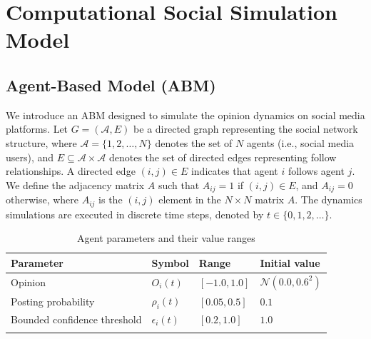 \documentclass[pdflatex,sn-mathphys-num]{sn-jnl}%
\theoremstyle{thmstyleone}%
\theoremstyle{thmstyletwo}%
\theoremstyle{thmstylethree}%
\def\AgentSet{\mathcal{A}}
\def\post{\rho} %
\def\BoundedConfidence{\epsilon}
\begin{document}
\section{Computational Social Simulation Model}\label{model}
\subsection{Agent-Based Model (ABM)}
We introduce an ABM designed to simulate the opinion
dynamics on social media platforms. Let $G = (\AgentSet, E)$ be a
directed graph representing the social network structure, where
$\AgentSet = \{1, 2, \dots, N\}$ denotes the set of $N$ agents (i.e.,
social media users), and $E \subseteq \AgentSet \times \AgentSet$ denotes the
set of directed edges representing follow relationships. A directed
edge $(i, j) \in E$ indicates that agent $i$ follows agent $j$. We
define the adjacency matrix $A$ such that $A_{ij} = 1$ if $(i,j)\in
E$, and $A_{ij} = 0$ otherwise, where $A_{ij}$ is the $(i,j)$ element
in the $N\times N$ matrix $A$. The dynamics simulations are executed in discrete
time steps, denoted by $t \in \{0, 1, 2, \dots\}$.
\par

\begin{table}[t]
  \tabcolsep=5pt
  \centering
  \caption{Agent parameters and their value ranges}\label{agentParam}
  \begin{tabular}{llll}
    \toprule
    Parameter & Symbol & Range & Initial value \\
    \midrule
    Opinion & $O_i(t)$ & $[-1.0, 1.0]$ & $\mathcal{N}(0.0, 0.6^2)$ \\
    Posting probability & $\post_i(t)$ & $[0.05, 0.5]$ & $0.1$ \\
    Bounded confidence threshold & $\BoundedConfidence_i(t)$ & $[0.2, 1.0]$ & $1.0$\\
    \bottomrule\\
  \end{tabular}
\end{table}
\end{document}
